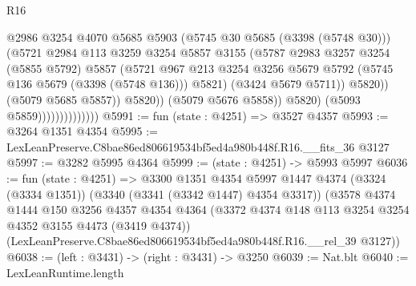 \begin{lexlean}{R16}
\begin{coremodule}
                                          @2986
                                          @3254
                                          @4070
                                          @5685
                                          @5903
                                          (@5745 @30 @5685 (@3398 (@5748 @30)))
                                          (@5721
                                            @2984
                                            @113
                                            @3259
                                            @3254
                                            @5857
                                            @3155
                                            (@5787
                                              @2983
                                              @3257
                                              @3254
                                              (@5855 @5792)
                                              @5857
                                              (@5721
                                                @967
                                                @213
                                                @3254
                                                @3256
                                                @5679
                                                @5792
                                                (@5745 @136 @5679 (@3398 (@5748 @136)))
                                                @5821)
                                              (@3424 @5679 @5711))
                                            @5820))
                                        (@5079 @5685 @5857))
                                      @5820))
                                  (@5079 @5676 @5858))
                                @5820)
                              (@5093 @5859))))))))))))))
@5991 := fun (state : @4251) => @3527 @4357
@5993 := @3264 @1351 @4354
@5995 := LexLeanPreserve.C8bae86ed806619534bf5ed4a980b448f.R16.__fits_36 @3127
@5997 := @3282 @5995 @4364
@5999 := (state : @4251) -> @5993 @5997
@6036 := fun (state : @4251) =>
  @3300
    @1351
    @4354
    @5997
    @1447
    @4374
    (@3324 (@3334 @1351))
    (@3340 (@3341 (@3342 @1447) @4354 @3317))
    (@3578
      @4374
      @1444
      @150
      @3256
      @4357
      @4354
      @4364
      (@3372 @4374 @148 @113 @3254 @3254 @4352 @3155 @4473 (@3419 @4374))
      (LexLeanPreserve.C8bae86ed806619534bf5ed4a980b448f.R16.__rel_39 @3127))
@6038 := (left : @3431) -> (right : @3431) -> @3250
@6039 := Nat.blt
@6040 := LexLeanRuntime.length

\end{coremodule}
\end{lexlean}
